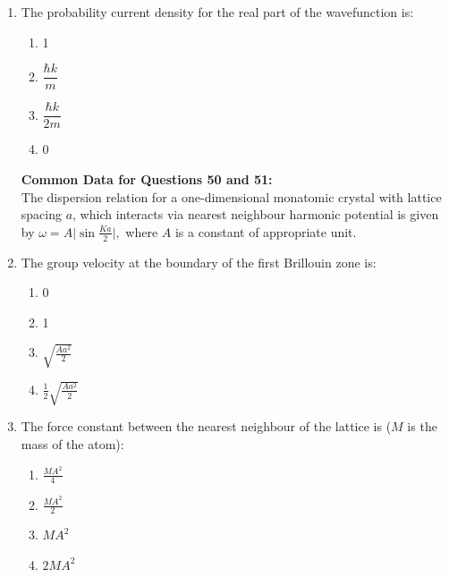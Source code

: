 \documentclass[journal,12pt,onecolumn]{IEEEtran}
\theoremstyle{remark}
\begin{document}
\begin{enumerate}
\item The probability current density for the real part of the wavefunction is:
\begin{multicols}{2}
\begin{enumerate}
    \item 1
    \item $ \dfrac{\hbar k}{m} $
    \item $ \dfrac{\hbar k}{2m} $
    \item 0
\end{enumerate}
\end{multicols}
 \textbf{Common Data for Questions 50 and 51:} \\

The dispersion relation for a one-dimensional monatomic crystal with lattice spacing $a$, which interacts via nearest neighbour harmonic potential is given by
$
\omega = A \biggl| \sin \frac{Ka}{2} \biggr|,
$
where $A$ is a constant of appropriate unit.

\item The group velocity at the boundary of the first Brillouin zone is:
\begin{multicols}{4}
\begin{enumerate}
    \item 0
    \item 1
    \item $\sqrt{\frac{Aa^2}{2}}$
    \item $\frac{1}{2} \sqrt{\frac{Aa^2}{2}}$
\end{enumerate}
\end{multicols}

\item The force constant between the nearest neighbour of the lattice is ($M$ is the mass of the atom):
\begin{multicols}{4}
\begin{enumerate}
    \item $\frac{MA^2}{4}$
    \item $\frac{MA^2}{2}$
    \item $MA^2$
    \item $2MA^2$
\end{enumerate}
\end{multicols}


\end{enumerate}
\end{document}
